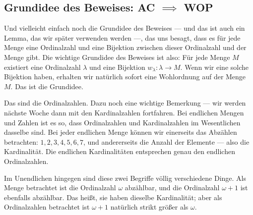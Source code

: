 \begin{math-stroke}

\end{math-stroke}

\subsection{Grundidee des Beweises: AC \texorpdfstring{$\implies$}{implies} WOP}
\begin{spoken-clean}[00:19:17 - 00:22:24]
Und vielleicht einfach noch die Grundidee des Beweises --- und das ist auch ein Lemma, das wir später verwenden werden ---, das uns besagt, dass es für jede Menge eine Ordinalzahl und eine Bijektion zwischen dieser Ordinalzahl und der Menge gibt. Die wichtige Grundidee des Beweises ist also: Für jede Menge $M$ existiert eine Ordinalzahl $\lambda$ und eine Bijektion $w_\lambda \colon \lambda \to M$. Wenn wir eine solche Bijektion haben, erhalten wir natürlich sofort eine Wohlordnung auf der Menge $M$. Das ist die Grundidee.

Das sind die Ordinalzahlen. Dazu noch eine wichtige Bemerkung --- wir werden nächste Woche dann mit den Kardinalzahlen fortfahren. Bei endlichen Mengen und Zahlen ist es so, dass Ordinalzahlen und Kardinalzahlen im Wesentlichen dasselbe sind. Bei jeder endlichen Menge können wir einerseits das Abzählen betrachten: $1, 2, 3, 4, 5, 6, 7$, und andererseits die Anzahl der Elemente --- also die Kardinalität. Die endlichen Kardinalitäten entsprechen genau den endlichen Ordinalzahlen.

Im Unendlichen hingegen sind diese zwei Begriffe völlig verschiedene Dinge. Als Menge betrachtet ist die Ordinalzahl $\omega$ abzählbar, und die Ordinalzahl $\omega + 1$ ist ebenfalls abzählbar. Das heißt, sie haben dieselbe Kardinalität; aber als Ordinalzahlen betrachtet ist $\omega + 1$ natürlich strikt größer als $\omega$.
\end{spoken-clean}

